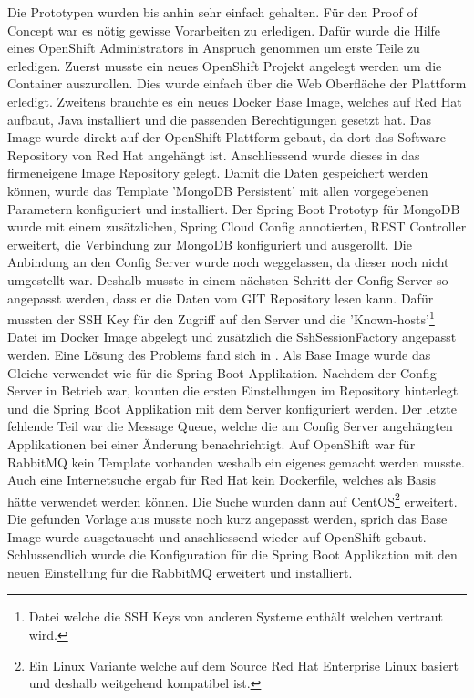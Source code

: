Die Prototypen wurden bis anhin sehr einfach gehalten. Für den Proof of Concept war es nötig gewisse Vorarbeiten zu erledigen. Dafür wurde die Hilfe eines OpenShift Administrators in Anspruch genommen um erste Teile zu erledigen.\newline
Zuerst musste ein neues OpenShift Projekt angelegt werden um die Container auszurollen. Dies wurde einfach über die Web Oberfläche der Plattform erledigt.
Zweitens brauchte es ein neues Docker Base Image, welches auf Red Hat aufbaut, Java installiert und die passenden Berechtigungen gesetzt hat. Das Image wurde direkt auf der OpenShift Plattform gebaut, da dort das Software Repository von Red Hat angehängt ist. Anschliessend wurde dieses in das firmeneigene Image Repository gelegt.\newline
Damit die Daten gespeichert werden können, wurde das Template 'MongoDB Persistent' mit allen vorgegebenen Parametern konfiguriert und installiert.
Der Spring Boot Prototyp für MongoDB wurde mit einem zusätzlichen, Spring Cloud Config annotierten, REST Controller erweitert, die Verbindung zur MongoDB konfiguriert und ausgerollt. Die Anbindung an den Config Server wurde noch weggelassen, da dieser noch nicht umgestellt war.
Deshalb musste in einem nächsten Schritt der Config Server so angepasst werden, dass er die Daten vom GIT Repository lesen kann. Dafür mussten der SSH Key für den Zugriff auf den Server und die 'Known-hosts'\footnote{Datei welche die SSH Keys von anderen Systeme enthält welchen vertraut wird.} Datei im Docker Image abgelegt und zusätzlich die SshSessionFactory angepasst werden. Eine Lösung des Problems fand sich in \cite{sccssh}. Als Base Image wurde das Gleiche verwendet wie für die Spring Boot Applikation.
Nachdem der Config Server in Betrieb war, konnten die ersten Einstellungen im Repository hinterlegt und die Spring Boot Applikation mit dem Server konfiguriert werden. Der letzte fehlende Teil war die Message Queue, welche die am Config Server angehängten Applikationen bei einer Änderung benachrichtigt. Auf OpenShift war für RabbitMQ kein Template vorhanden weshalb ein eigenes gemacht werden musste. Auch eine Internetsuche ergab für Red Hat kein Dockerfile, welches als Basis hätte verwendet werden können. Die Suche wurden dann auf CentOS\footnote{Ein Linux Variante welche auf dem Source Red Hat Enterprise Linux basiert und deshalb weitgehend kompatibel ist.} erweitert. Die gefunden Vorlage aus \cite{rmcentos7} musste noch kurz angepasst werden, sprich das Base Image wurde ausgetauscht und anschliessend wieder auf OpenShift gebaut. Schlussendlich wurde die Konfiguration für die Spring Boot Applikation mit den neuen Einstellung für die RabbitMQ erweitert und installiert.

